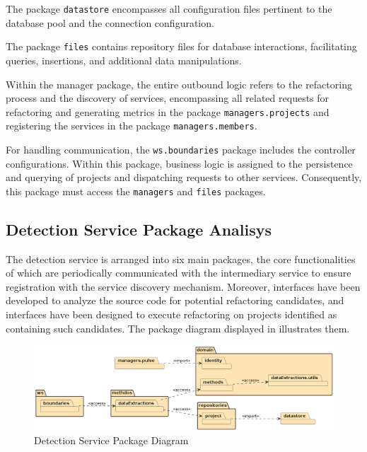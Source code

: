 The package \verb|datastore| encompasses all configuration files pertinent to the database pool and the connection configuration.

The package \verb|files| contains repository files for database interactions, facilitating queries, insertions, and additional data manipulations.

Within the manager package, the entire outbound logic refers to the refactoring process and the discovery of services, encompassing all related requests for refactoring and generating metrics in the package \verb|managers.projects| and registering the services in the package \verb|managers.members|.

For handling communication, the \verb|ws.boundaries| package includes the controller configurations. Within this package, business logic is assigned to the persistence and querying of projects and dispatching requests to other services. Consequently, this package must access the \verb|managers| and \verb|files| packages.

\subsection{Detection Service Package Analisys}

The detection service is arranged into six main packages, the core functionalities of which are periodically communicated with the intermediary service to ensure registration with the service discovery mechanism. Moreover, interfaces have been developed to analyze the source code for potential refactoring candidates, and interfaces have been designed to execute refactoring on projects identified as containing such candidates. The package diagram displayed in  illustrates them.
\begin{figure}[ht!]
\SetCaptionWidth{\textwidth}
\caption{Detection Service Package Diagram}
\label{fig-package-detection}
\includegraphics[width =\textwidth, scale=1.0]{Chapter-4/Figures/detection-service.png}
\end{figure}
\FloatBarrier

